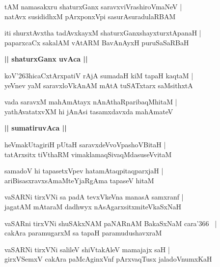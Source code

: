 \documentclass[twoside,12pt,openright]{book}
\def\S{\char'263}
\newcounter{shloka}[chapter]
\def\uvaca#1{\centerline{{\large\textbf{#1}}}}
\begin{document}
\begin{shloka}%
tAM namasakxru shaturxGanx saravxviVrashiroVmaNeV |\\
natAvx susididhxM pArxponxVpi sasurAsuradulaRBAM 
\end{shloka}

\begin{shloka}%
iti shurxtAvxtha tadAvxkayxM shaturxGanxshayxturxtApanaH |\\
paparxcaCx sakalAM vAtARM BavAnAyxH puruSaSaRBaH 
\end{shloka}

\uvaca{|| shaturxGanx uvAca ||}

\begin{shloka}%
koV\S hicaCxtArxpatiV rAjA sumadaH kiM tapaH kaqtaM |\\
yeVnev yaM saravxloVkAnAM mAtA tuSATxtarx saMsithxtA
\end{shloka}

\begin{shloka}%
vada saravxM mahAmAtayx nAnAthaRparibaqMhitaM |\\
yathAvatatxvXM hi jAnAsi tasamxdavxda mahAmateV 
\end{shloka}

\uvaca{|| sumatiruvAca ||}

\begin{shloka}%
heVmakUtagiriH pUtaH saravxdeVvoVpashoVBitaH |\\
tatArxsitx tiVthaRM vimaklamaqSivaqMdasuseVvitaM 
\end{shloka}

\begin{shloka}%
samadoV hi tapasetxVpev hatamAtaqpitaqparxjaH |\\
ariBisasxravxsAmaMteYjaRgAma tapaseV hitaM 
\end{shloka}

\begin{shloka}%
vaSARNi tirxVNi sa padA tevxVkeVna manasA samxranf |\\
jagatAM mAtaraM dadhwyx nAsAgarxsitxmiteVkaSxNaH 
\end{shloka}

\begin{shloka}%
vaSARni tirxVNi shuSAkxNAM paNARnAM BakaSxNaM cara\char'366 ~|\\
cakAra paramugarxM sa tapaH paramudushavxraM  
\end{shloka}

\begin{shloka}%
vaSARNi tirxVNi salileV shiVtakAleV mamajajx saH |\\
girxVSemxV cakAra paMcAginxVnf pArxvaqTusx jaladoVnumxKaH
\end{shloka}
\end{document}
